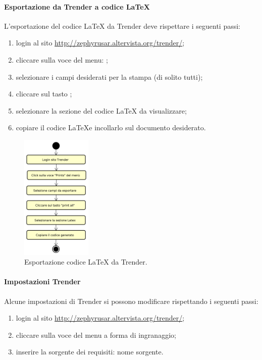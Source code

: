 		\paragraph{Esportazione da Trender a codice \LaTeX}
		L'esportazione del codice \LaTeX{} da Trender deve rispettare i seguenti passi:
		\begin{enumerate}
			\item login al sito \url{http://zephyrusar.altervista.org/trender/};
			\item cliccare sulla voce del menu: ;
			\item selezionare i campi desiderati per la stampa (di solito tutti);
			\item cliccare sul tasto ;
			\item selezionare la sezione del codice \LaTeX{} da visualizzare;
			\item copiare il codice \LaTeX e incollarlo sul documento desiderato.
		\end{enumerate}
		\begin{figure}[H]
			\centering
			\includegraphics[width=0.3\textwidth]{img/Export}
			\caption{Esportazione codice \LaTeX{} da Trender.}
		\end{figure}
		\paragraph{Impostazioni Trender}
		Alcune impostazioni di Trender si possono modificare rispettando i seguenti passi:
		\begin{enumerate}
			\item login al sito \url{http://zephyrusar.altervista.org/trender/};
			\item cliccare sulla voce del menu a forma di ingranaggio;
			\item inserire la sorgente dei requisiti: nome sorgente.
		\end{enumerate}
